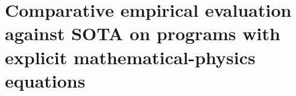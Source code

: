 %
%
%
%
%
%

\section{Comparative empirical evaluation against SOTA on programs with explicit mathematical-physics equations}
\label{sec:empirical-vs-sota}

